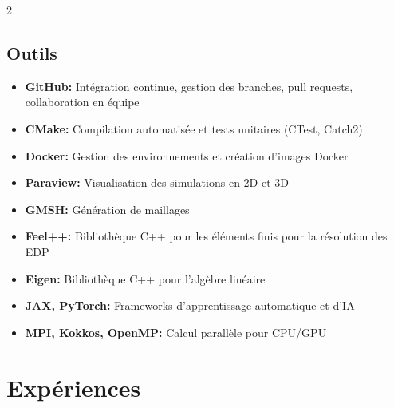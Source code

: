 \documentclass[lighthipster]{latex_for_CV/simplehipstercv}
\begin{document}
\begin{paracol}{2}
\subsection*{\small Outils}
\setlength{\itemsep}{-0.35em}
\begin{itemize} 
    \item \textbf{GitHub:} Intégration continue, gestion des branches, pull requests, collaboration en équipe \\[-0.4cm]
    \item \textbf{CMake:} Compilation automatisée et tests unitaires (CTest, Catch2) \\[-0.4cm]
    \item \textbf{Docker:} Gestion des environnements et création d'images Docker \\[-0.4cm]
    \item \textbf{Paraview:} Visualisation des simulations en 2D et 3D \\[-0.4cm]
    \item \textbf{GMSH:} Génération de maillages \\[-0.4cm]
    \item \textbf{Feel++:} Bibliothèque C++ pour les éléments finis pour la résolution des EDP \\[-0.4cm]
    \item \textbf{Eigen:} Bibliothèque C++ pour l'algèbre linéaire \\[-0.4cm]
    \item \textbf{JAX, PyTorch:} Frameworks d'apprentissage automatique et d'IA \\[-0.4cm]
    \item \textbf{MPI, Kokkos, OpenMP:} Calcul parallèle pour CPU/GPU
\end{itemize}




\vspace{0.3cm}



\small
\section*{Expériences}


\end{paracol}
\end{document}
